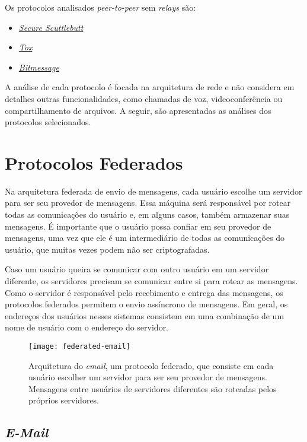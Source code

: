 Os protocolos analisados \textit{peer-to-peer} sem \textit{relays} são:
\begin{itemize}
  \item \href{https://scuttlebutt.nz/}{\textit{Secure Scuttlebutt}}
  \item \href{https://tox.chat/}{\textit{Tox}}
  \item \href{https://bitmessage.org/}{\textit{Bitmessage}}
\end{itemize}

A análise de cada protocolo é focada na arquitetura de rede e não considera em detalhes outras funcionalidades, como chamadas de voz, videoconferência ou compartilhamento de arquivos. A seguir, são apresentadas as análises dos protocolos selecionados.

\section{Protocolos Federados}

Na arquitetura federada de envio de mensagens, cada usuário escolhe um servidor para ser seu provedor de mensagens. Essa máquina será responsável por rotear todas as comunicações do usuário e, em alguns casos, também armazenar suas mensagens. É importante que o usuário possa confiar em seu provedor de mensagens, uma vez que ele é um intermediário de todas as comunicações do usuário, que muitas vezes podem não ser criptografadas.

Caso um usuário queira se comunicar com outro usuário em um servidor diferente, os servidores precisam se comunicar entre si para rotear as mensagens. Como o servidor é responsável pelo recebimento e entrega das mensagens, os protocolos federados permitem o envio assíncrono de mensagens. Em geral, os endereços dos usuários nesses sistemas consistem em uma combinação de um nome de usuário com o endereço do servidor.

\begin{figure}
  \centering
  \texttt{[image: federated-email]}

  \caption{Arquitetura do \textit{email}, um protocolo federado, que consiste em cada usuário escolher um servidor para ser seu provedor de mensagens. Mensagens entre usuários de servidores diferentes são roteadas pelos próprios servidores. \cite{email-picture}}
\end{figure}

\subsection{\textit{E-Mail}}

